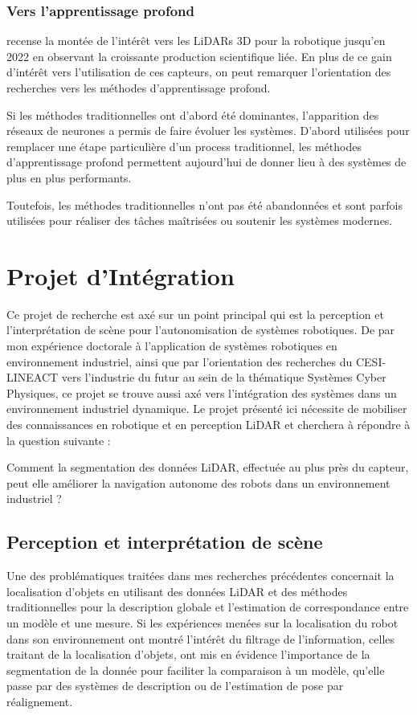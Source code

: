\documentclass[a4paper, french, 10pt, onecolumn, notitlepage, roman]{article}
\begin{document}
\subsubsection{Vers l'apprentissage profond}
\cite{yang:arxiv:2022} recense la montée de l'intérêt vers les LiDARs 3D pour la robotique jusqu'en 2022 en observant la croissante production scientifique liée.
En plus de ce gain d'intérêt vers l'utilisation de ces capteurs, on peut remarquer l'orientation des recherches vers les méthodes d'apprentissage profond.

Si les méthodes traditionnelles ont d'abord été dominantes, l'apparition des réseaux de neurones a permis de faire évoluer les systèmes.
D'abord utilisées pour remplacer une étape particulière d'un process traditionnel, les méthodes d'apprentissage profond permettent aujourd'hui de donner lieu à des systèmes de plus en plus performants.

Toutefois, les méthodes traditionnelles n'ont pas été abandonnées et sont parfois utilisées pour réaliser des tâches maîtrisées ou soutenir les systèmes modernes.

\section{Projet d'Intégration}

Ce projet de recherche est axé sur un point principal qui est la perception et l'interprétation de scène pour l'autonomisation de systèmes robotiques.
De par mon expérience doctorale à l'application de systèmes robotiques en environnement industriel, ainsi que par l'orientation des recherches du CESI-LINEACT vers l'industrie du futur au sein de la thématique Systèmes Cyber Physiques, ce projet se trouve aussi axé vers l'intégration des systèmes dans un environnement industriel dynamique.
Le projet présenté ici nécessite de mobiliser des connaissances en robotique et en perception LiDAR et cherchera à répondre à la question suivante :

Comment la segmentation des données LiDAR, effectuée au plus près du capteur, peut elle améliorer la navigation autonome des robots dans un environnement industriel ?

\subsection{Perception et interprétation de scène}
Une des problématiques traitées dans mes recherches précédentes concernait la localisation d'objets en utilisant des données LiDAR et des méthodes traditionnelles pour la description globale et l'estimation de correspondance entre un modèle et une mesure.
Si les expériences menées sur la localisation du robot dans son environnement ont montré l'intérêt du filtrage de l'information, celles traitant de la localisation d'objets, ont mis en évidence l'importance de la segmentation de la donnée pour faciliter la comparaison à un modèle, qu'elle passe par des systèmes de description ou de l'estimation de pose par réalignement.
\end{document}
